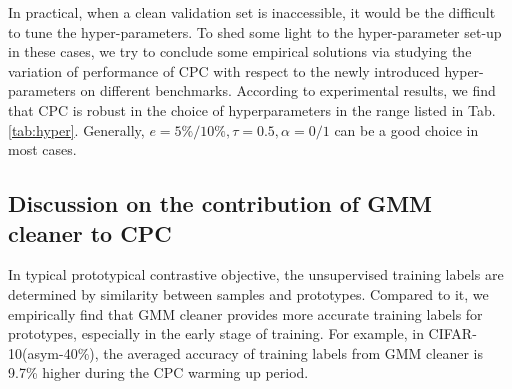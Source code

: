 \documentclass{article} \usepackage{iclr2023_conference,times}
\begin{document}
In practical, when a clean validation set is inaccessible, it would be the difficult to tune the hyper-parameters. To shed some light to the hyper-parameter set-up in these cases, we try to conclude some empirical solutions via studying the variation of performance of CPC with respect to the newly introduced hyper-parameters on different benchmarks. According to experimental results, we find that CPC is robust in the choice of hyperparameters in the range listed in Tab.\ref{tab:hyper}. Generally, $e=5\%/10\%, \tau=0.5, \alpha=0/1$ can be a good choice in most cases.

\begin{table}[]
\caption{The variation of performance of CPC with respect to the change of hyper-parameters. The classification accuracy of DNNs is reported. The best results are indicated with  boldface. }\label{tab:hyper}
\end{table}

\subsection{Discussion on the contribution of GMM cleaner to CPC} \label{app:abl}


  In typical prototypical contrastive objective, the unsupervised training labels are determined by similarity between samples and prototypes. Compared to it, we empirically find that GMM cleaner provides more accurate training labels for prototypes, especially in the early stage of training. For example, in CIFAR-10(asym-40\%), the averaged accuracy of training labels from GMM cleaner is 9.7\% higher during the CPC warming up period. 
  
\end{document}
